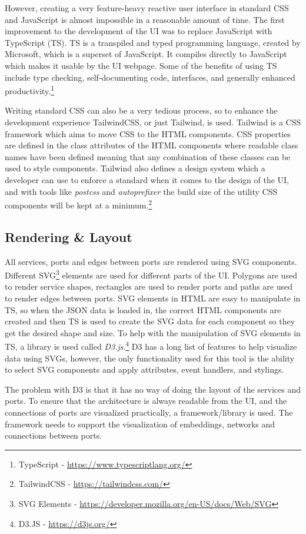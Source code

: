 However, creating a very feature-heavy reactive user interface in standard CSS and JavaScript is almost impossible in a reasonable amount of time.
The first improvement to the development of the UI was to replace JavaScript with TypeScript (TS).
TS is a transpiled and typed programming language, created by Microsoft, which is a superset of JavaScript. It compiles directly to JavaScript which makes it usable by the UI webpage.
Some of the benefits of using TS include type checking, self-documenting code, interfaces, and generally enhanced productivity.\footnote{TypeScript - \url{https://www.typescriptlang.org/}}

Writing standard CSS can also be a very tedious process, so to enhance the development experience TailwindCSS, or just Tailwind, is used.
Tailwind is a CSS framework which aims to move CSS to the HTML components. CSS properties are defined in the class attributes of the HTML components where readable class names have been defined meaning that any combination of these classes can be used to style components.
Tailwind also defines a design system which a developer can use to enforce a standard when it comes to the design of the UI, and with tools like \textit{postcss} and \textit{autoprefixer} the build size of the utility CSS components will be kept at a minimum.\footnote{TailwindCSS - \url{https://tailwindcss.com/}}

\subsection{Rendering \& Layout}
All services, ports and edges between ports are rendered using SVG components.
Different SVG\footnote{SVG Elements - \url{https://developer.mozilla.org/en-US/docs/Web/SVG}} elements are used for different parts of the UI. Polygons are used to render service shapes, rectangles are used to render ports and paths are used to render edges between ports.
SVG elements in HTML are easy to manipulate in TS, so when the JSON data is loaded in, the correct HTML components are created and then TS is used to create the SVG data for each component so they get the desired shape and size.
To help with the manipulation of SVG elements in TS, a library is used called \textit{D3.js}.\footnote{D3.JS - \url{https://d3js.org/}} D3 has a long list of features to help visualize data using SVGs, however, the only functionality used for this tool is
the ability to select SVG components and apply attributes, event handlers, and stylings.

The problem with D3 is that it has no way of doing the layout of the services and ports.
To ensure that the architecture is always readable from the UI, and the connections of ports are visualized practically, a framework/library is used.
The framework needs to support the visualization of embeddings, networks and connections between ports.

